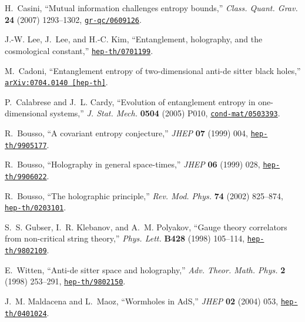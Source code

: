 \documentclass[12pt]{article}
\begin{document}
\begin{thebibliography}{10}
H.~Casini, ``Mutual information challenges entropy bounds,'' {\em Class. Quant.
  Grav.} {\bf 24} (2007)  1293--1302,
\href{http://arxiv.org/abs/gr-qc/0609126}{{\tt gr-qc/0609126}}.

J.-W. Lee, J.~Lee, and H.-C. Kim, ``Entanglement, holography, and the
  cosmological constant,''
\href{http://arxiv.org/abs/hep-th/0701199}{{\tt hep-th/0701199}}.

M.~Cadoni, ``Entanglement entropy of two-dimensional anti-de sitter black
  holes,''
\href{http://arxiv.org/abs/arXiv:0704.0140 [hep-th]}{{\tt arXiv:0704.0140
  [hep-th]}}.

P.~Calabrese and J.~L. Cardy, ``Evolution of entanglement entropy in
  one-dimensional systems,'' {\em J. Stat. Mech.} {\bf 0504} (2005)  P010,
\href{http://arxiv.org/abs/cond-mat/0503393}{{\tt cond-mat/0503393}}.

R.~Bousso, ``A covariant entropy conjecture,'' {\em JHEP} {\bf 07} (1999)  004,
\href{http://arxiv.org/abs/hep-th/9905177}{{\tt hep-th/9905177}}.

R.~Bousso, ``Holography in general space-times,'' {\em JHEP} {\bf 06} (1999)
  028,
\href{http://arxiv.org/abs/hep-th/9906022}{{\tt hep-th/9906022}}.

R.~Bousso, ``The holographic principle,'' {\em Rev. Mod. Phys.} {\bf 74} (2002)
   825--874,
\href{http://arxiv.org/abs/hep-th/0203101}{{\tt hep-th/0203101}}.

S.~S. Gubser, I.~R. Klebanov, and A.~M. Polyakov, ``Gauge theory correlators
  from non-critical string theory,'' {\em Phys. Lett.} {\bf B428} (1998)
  105--114,
\href{http://arxiv.org/abs/hep-th/9802109}{{\tt hep-th/9802109}}.

E.~Witten, ``Anti-de sitter space and holography,'' {\em Adv. Theor. Math.
  Phys.} {\bf 2} (1998)  253--291,
\href{http://arxiv.org/abs/hep-th/9802150}{{\tt hep-th/9802150}}.

J.~M. Maldacena and L.~Maoz, ``Wormholes in AdS,'' {\em JHEP} {\bf 02} (2004)
  053,
\href{http://arxiv.org/abs/hep-th/0401024}{{\tt hep-th/0401024}}.


\end{thebibliography}
\end{document}
